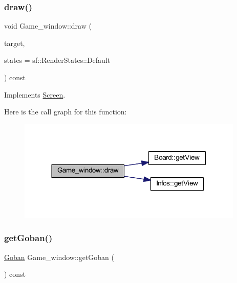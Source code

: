 \subsubsection{\texorpdfstring{draw()}{draw()}}
{\footnotesize\ttfamily void Game\+\_\+window\+::draw (\begin{DoxyParamCaption}\item[{sf\+::\+Render\+Target \&}]{target,  }\item[{sf\+::\+Render\+States}]{states = {\ttfamily sf\+:\+:RenderStates\+:\+:Default} }\end{DoxyParamCaption}) const\hspace{0.3cm}{\ttfamily [virtual]}}



Implements \hyperlink{class_screen_abcb5544dfe717c7da181520803f43e25}{Screen}.

Here is the call graph for this function\+:
\nopagebreak
\begin{figure}[H]
\begin{center}
\leavevmode
\includegraphics[width=305pt]{class_game__window_aafdea9d00265261abfac6ad233b54638_cgraph}
\end{center}
\end{figure}
\mbox{\label{class_game__window_a782f1aca3d28de1350375b10459073d4}} 
\subsubsection{\texorpdfstring{get\+Goban()}{getGoban()}}
{\footnotesize\ttfamily \hyperlink{class_goban}{Goban} Game\+\_\+window\+::get\+Goban (\begin{DoxyParamCaption}{ }\end{DoxyParamCaption}) const}

